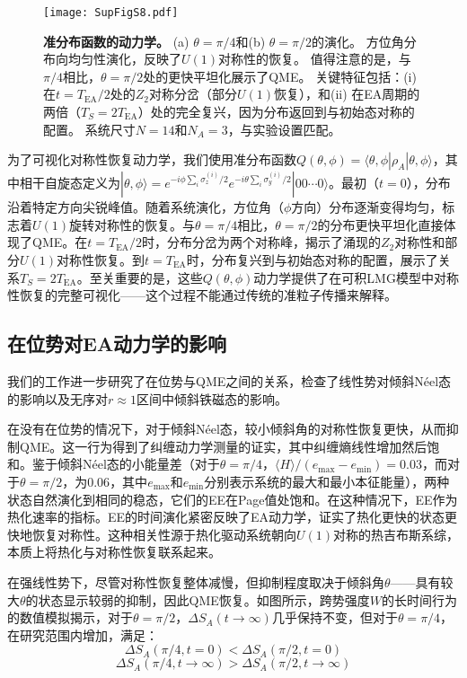 \documentclass[11pt,a4paper]{article}
\begin{document}
\begin{figure}[H]
    \centering
    \texttt{[image: SupFigS8.pdf]}
    \caption{
        \textbf{准分布函数的动力学。}
        (a) $\theta=\pi/4$和(b) $\theta=\pi/2$的演化。
        方位角分布向均匀性演化，反映了$U(1)$对称性的恢复。
        值得注意的是，与$\pi/4$相比，$\theta=\pi/2$处的更快平坦化展示了QME。
        关键特征包括：(i) 在$t=T_{\text{EA}}/2$处的$Z_2$对称分岔（部分$U(1)$恢复），和(ii) 在EA周期的两倍（$T_S=2T_{\text{EA}}$）处的完全复兴，因为分布返回到与初始态对称的配置。
        系统尺寸$N=14$和$N_A=3$，与实验设置匹配。
    }
    \label{fig:quasidistribution_dynamics}
\end{figure}

为了可视化对称性恢复动力学，我们使用准分布函数$Q(\theta,\phi)=\langle\theta,\phi|\rho_A|\theta,\phi\rangle$，其中相干自旋态定义为$|\theta,\phi\rangle=e^{-i\phi\sum_i\sigma_z^{(i)}/2}e^{-i\theta\sum_i\sigma_y^{(i)}/2}|00\cdots 0\rangle$。最初（$t=0$），分布沿着特定方向尖锐峰值。随着系统演化，方位角（$\phi$方向）分布逐渐变得均匀，标志着$U(1)$旋转对称性的恢复。与$\theta=\pi/4$相比，$\theta=\pi/2$的分布更快平坦化直接体现了QME。在$t=T_{\text{EA}}/2$时，分布分岔为两个对称峰，揭示了涌现的$Z_2$对称性和部分$U(1)$对称性恢复。到$t=T_{\text{EA}}$时，分布复兴到与初始态对称的配置，展示了关系$T_S=2T_{\text{EA}}$。至关重要的是，这些$Q(\theta,\phi)$动力学提供了在可积LMG模型中对称性恢复的完整可视化——这个过程不能通过传统的准粒子传播来解释。

\subsection{在位势对EA动力学的影响}

我们的工作进一步研究了在位势与QME之间的关系，检查了线性势对倾斜Néel态的影响以及无序对$r\approx 1$区间中倾斜铁磁态的影响。

在没有在位势的情况下，对于倾斜Néel态，较小倾斜角的对称性恢复更快，从而抑制QME。这一行为得到了纠缠动力学测量的证实，其中纠缠熵线性增加然后饱和。鉴于倾斜Néel态的小能量差（对于$\theta=\pi/4$，$\langle H\rangle/(e_{\text{max}}-e_{\text{min}})=0.03$，而对于$\theta=\pi/2$，为$0.06$，其中$e_{\text{max}}$和$e_{\text{min}}$分别表示系统的最大和最小本征能量），两种状态自然演化到相同的稳态，它们的EE在Page值处饱和。在这种情况下，EE作为热化速率的指标。EE的时间演化紧密反映了EA动力学，证实了热化更快的状态更快地恢复对称性。这种相关性源于热化驱动系统朝向$U(1)$对称的热吉布斯系综，本质上将热化与对称性恢复联系起来。

在强线性势下，尽管对称性恢复整体减慢，但抑制程度取决于倾斜角$\theta$——具有较大$\theta$的状态显示较弱的抑制，因此QME恢复。如图所示，跨势强度$W$的长时间行为的数值模拟揭示，对于$\theta=\pi/2$，$\Delta S_A(t\rightarrow\infty)$几乎保持不变，但对于$\theta=\pi/4$，在研究范围内增加，满足：
\[
\Delta S_A(\pi/4,t=0) < \Delta S_A(\pi/2,t=0)
\]
\[
\Delta S_A(\pi/4,t\rightarrow\infty) > \Delta S_A(\pi/2,t\rightarrow\infty)
\]
\end{document}
